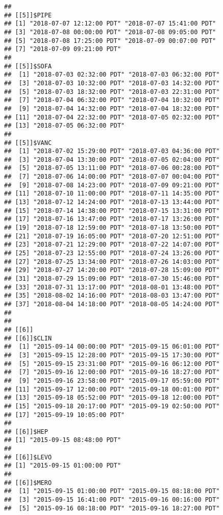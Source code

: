 \documentclass[]{article}
\begin{document}
\begin{verbatim}
## 
## [[5]]$PIPE
## [1] "2018-07-07 12:12:00 PDT" "2018-07-07 15:41:00 PDT"
## [3] "2018-07-08 00:00:00 PDT" "2018-07-08 09:05:00 PDT"
## [5] "2018-07-08 17:25:00 PDT" "2018-07-09 00:07:00 PDT"
## [7] "2018-07-09 09:21:00 PDT"
## 
## [[5]]$SOFA
##  [1] "2018-07-03 02:32:00 PDT" "2018-07-03 06:32:00 PDT"
##  [3] "2018-07-03 10:32:00 PDT" "2018-07-03 14:32:00 PDT"
##  [5] "2018-07-03 18:32:00 PDT" "2018-07-03 22:31:00 PDT"
##  [7] "2018-07-04 06:32:00 PDT" "2018-07-04 10:32:00 PDT"
##  [9] "2018-07-04 14:32:00 PDT" "2018-07-04 18:32:00 PDT"
## [11] "2018-07-04 22:32:00 PDT" "2018-07-05 02:32:00 PDT"
## [13] "2018-07-05 06:32:00 PDT"
## 
## [[5]]$VANC
##  [1] "2018-07-02 15:29:00 PDT" "2018-07-03 04:36:00 PDT"
##  [3] "2018-07-04 13:30:00 PDT" "2018-07-05 02:04:00 PDT"
##  [5] "2018-07-05 13:11:00 PDT" "2018-07-06 00:28:00 PDT"
##  [7] "2018-07-06 14:00:00 PDT" "2018-07-07 00:04:00 PDT"
##  [9] "2018-07-08 14:23:00 PDT" "2018-07-09 09:21:00 PDT"
## [11] "2018-07-10 11:00:00 PDT" "2018-07-11 14:35:00 PDT"
## [13] "2018-07-12 14:24:00 PDT" "2018-07-13 13:44:00 PDT"
## [15] "2018-07-14 14:38:00 PDT" "2018-07-15 13:31:00 PDT"
## [17] "2018-07-16 13:47:00 PDT" "2018-07-17 13:26:00 PDT"
## [19] "2018-07-18 12:59:00 PDT" "2018-07-18 13:50:00 PDT"
## [21] "2018-07-19 16:05:00 PDT" "2018-07-20 12:51:00 PDT"
## [23] "2018-07-21 12:29:00 PDT" "2018-07-22 14:07:00 PDT"
## [25] "2018-07-23 12:55:00 PDT" "2018-07-24 13:26:00 PDT"
## [27] "2018-07-25 13:34:00 PDT" "2018-07-26 14:03:00 PDT"
## [29] "2018-07-27 14:20:00 PDT" "2018-07-28 15:09:00 PDT"
## [31] "2018-07-29 15:09:00 PDT" "2018-07-30 15:46:00 PDT"
## [33] "2018-07-31 13:17:00 PDT" "2018-08-01 13:48:00 PDT"
## [35] "2018-08-02 14:16:00 PDT" "2018-08-03 13:47:00 PDT"
## [37] "2018-08-04 14:18:00 PDT" "2018-08-05 14:24:00 PDT"
## 
## 
## [[6]]
## [[6]]$CLIN
##  [1] "2015-09-14 00:00:00 PDT" "2015-09-15 06:01:00 PDT"
##  [3] "2015-09-15 12:28:00 PDT" "2015-09-15 17:30:00 PDT"
##  [5] "2015-09-15 23:31:00 PDT" "2015-09-16 06:12:00 PDT"
##  [7] "2015-09-16 12:00:00 PDT" "2015-09-16 18:27:00 PDT"
##  [9] "2015-09-16 23:58:00 PDT" "2015-09-17 05:59:00 PDT"
## [11] "2015-09-17 12:00:00 PDT" "2015-09-18 00:01:00 PDT"
## [13] "2015-09-18 05:52:00 PDT" "2015-09-18 12:00:00 PDT"
## [15] "2015-09-18 20:17:00 PDT" "2015-09-19 02:50:00 PDT"
## [17] "2015-09-19 10:05:00 PDT"
## 
## [[6]]$HEP
## [1] "2015-09-15 08:48:00 PDT"
## 
## [[6]]$LEVO
## [1] "2015-09-15 01:00:00 PDT"
## 
## [[6]]$MERO
##  [1] "2015-09-15 01:00:00 PDT" "2015-09-15 08:18:00 PDT"
##  [3] "2015-09-15 16:41:00 PDT" "2015-09-16 00:16:00 PDT"
##  [5] "2015-09-16 08:18:00 PDT" "2015-09-16 18:27:00 PDT"

\end{verbatim}
\end{document}
